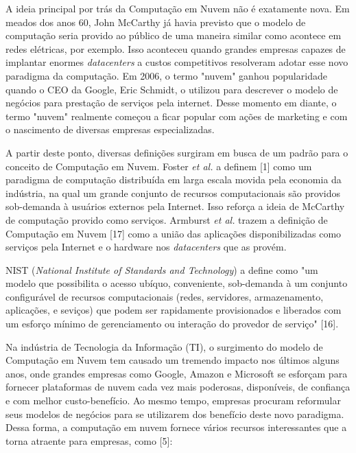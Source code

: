 A ideia principal por trás da Computação em Nuvem não é exatamente nova. Em meados dos anos 60, John McCarthy já havia previsto que o modelo de computação seria provido ao público de uma maneira similar como acontece em redes elétricas, por exemplo. Isso aconteceu quando grandes empresas capazes de implantar enormes \textit{datacenters} a custos competitivos resolveram adotar esse novo paradigma da computação. Em 2006, o termo "nuvem" ganhou popularidade quando o CEO da Google, Eric Schmidt, o utilizou para descrever o modelo de negócios para prestação de serviços pela internet. Desse momento em diante, o termo "nuvem" realmente começou a ficar popular com ações de marketing e com o nascimento de diversas empresas especializadas. 

A partir deste ponto, diversas definições surgiram em busca de um padrão para o conceito de Computação em Nuvem. Foster \textit{et al.} a definem [1] como um paradigma de computação distribuída em larga escala movida pela economia da indústria, na qual um grande conjunto de recursos computacionais são providos sob-demanda à usuários externos pela Internet. Isso reforça a ideia de McCarthy de computação provido como serviços. Armburst \textit{et al.} trazem a definição de Computação em Nuvem [17] como a união das aplicações disponibilizadas como serviços pela Internet e o hardware nos \textit{datacenters} que as provém. 

NIST (\textit{National Institute of Standards and Technology}) a define como "um modelo que possibilita o acesso ubíquo, conveniente, sob-demanda à um conjunto configurável de recursos computacionais (redes, servidores, armazenamento, aplicações, e seviços) que podem ser rapidamente provisionados e liberados com um esforço mínimo de gerenciamento ou interação do provedor de serviço" [16]. 

Na indústria de Tecnologia da Informação (TI), o surgimento do modelo de Computação em Nuvem tem causado um tremendo impacto nos últimos alguns anos, onde grandes empresas como Google, Amazon e Microsoft se esforçam para fornecer plataformas de nuvem cada vez mais poderosas, disponíveis, de confiança e com melhor custo-benefício. Ao mesmo tempo, empresas procuram reformular seus modelos de negócios para se utilizarem dos benefício deste novo paradigma. Dessa forma, a computação em nuvem fornece vários recursos interessantes que a torna atraente para empresas, como [5]:

